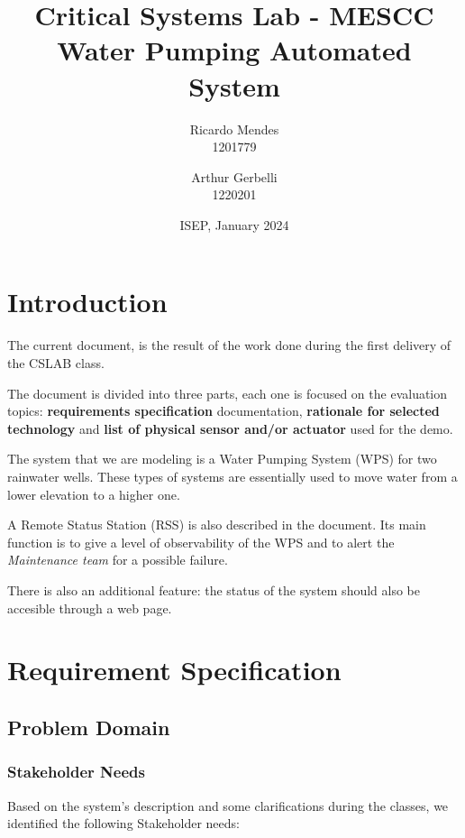 \documentclass[11pt]{article}
\title{\textbf{Critical Systems Lab - MESCC\\ Water Pumping Automated System}}
\date{ISEP, January 2024}
\author{Ricardo Mendes\\ 1201779
\and Arthur Gerbelli\\ 1220201}
\begin{document}
\maketitle              
\newpage
\tableofcontents
\newpage

%
\section{Introduction}

The current document, is the result of the work done during the first delivery of the CSLAB class.

The document is divided into three parts, each one is focused on the evaluation topics: \textbf{requirements specification} documentation, \textbf{rationale for selected technology} and \textbf{list of physical sensor and/or actuator} used for the demo.

The system that we are modeling is a Water Pumping System (WPS) for two rainwater wells. These types of systems are essentially used to move water from a lower elevation to a higher one.

A Remote Status Station (RSS) is also described in the document. Its main function is to give a level of observability of the WPS and to alert the \textit{Maintenance team} for a possible failure.

There is also an additional feature: the status of the system should also be accesible through a web page.


\section{Requirement Specification}

\subsection{Problem Domain}

\subsubsection{Stakeholder Needs}

Based on the system's description and some clarifications during the classes, we identified the following Stakeholder needs:
\end{document}
